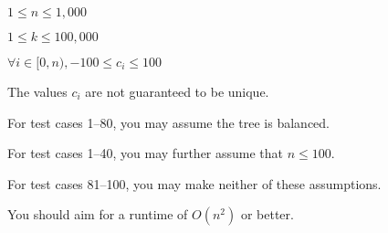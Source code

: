 $1 \leq n \leq 1,000$

$1 \leq k \leq 100,000$

$\forall i \in [0, n), -100 \leq c_i \leq 100$

The values $c_i$ are not guaranteed to be unique.

For test cases 1--80, you may assume the tree is balanced.

For test cases 1--40, you may further assume that $n \leq 100$.

For test cases 81--100, you may make neither of these assumptions.

You should aim for a runtime of $O(n^2)$ or better.